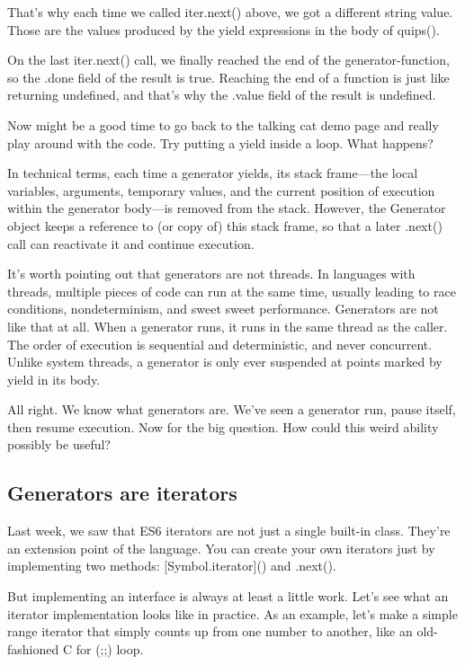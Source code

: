         That's why each time we called iter.next() above, we got a different string value. Those are the values produced by the yield expressions in the body of quips().

        On the last iter.next() call, we finally reached the end of the generator-function, so the .done field of the result is true. Reaching the end of a function is just like returning undefined, and that's why the .value field of the result is undefined.

        Now might be a good time to go back to the talking cat demo page and really play around with the code. Try putting a yield inside a loop. What happens?

        In technical terms, each time a generator yields, its stack frame—the local variables, arguments, temporary values, and the current position of execution within the generator body—is removed from the stack. However, the Generator object keeps a reference to (or copy of) this stack frame, so that a later .next() call can reactivate it and continue execution.

        It's worth pointing out that generators are not threads. In languages with threads, multiple pieces of code can run at the same time, usually leading to race conditions, nondeterminism, and sweet sweet performance. Generators are not like that at all. When a generator runs, it runs in the same thread as the caller. The order of execution is sequential and deterministic, and never concurrent. Unlike system threads, a generator is only ever suspended at points marked by yield in its body.

        All right. We know what generators are. We've seen a generator run, pause itself, then resume execution. Now for the big question. How could this weird ability possibly be useful?

    \subsection{Generators are iterators}
      \label{subsec:generators_are_iterators}
        Last week, we saw that ES6 iterators are not just a single built-in class. They're an extension point of the language. You can create your own iterators just by implementing two methods: [Symbol.iterator]() and .next().

        But implementing an interface is always at least a little work. Let's see what an iterator implementation looks like in practice. As an example, let's make a simple range iterator that simply counts up from one number to another, like an old-fashioned C for (;;) loop.

